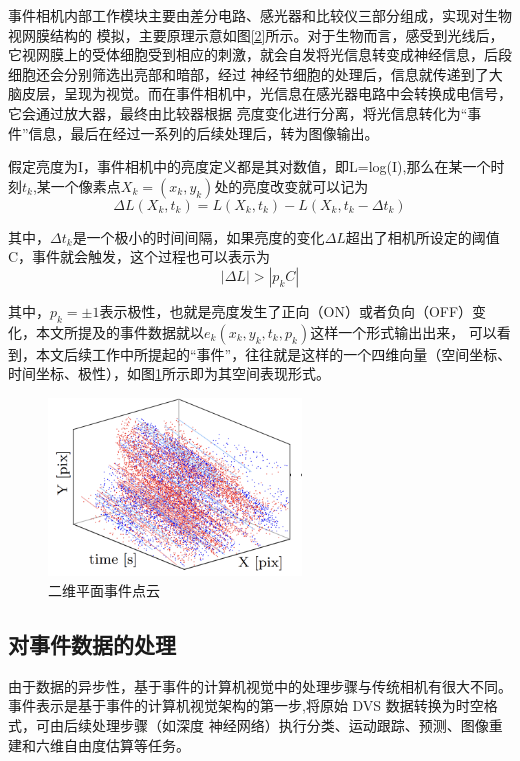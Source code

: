 事件相机内部工作模块主要由差分电路、感光器和比较仪三部分组成，实现对生物视网膜结构的
模拟，主要原理示意如图\ref{2}所示。对于生物而言，感受到光线后，它视网膜上的受体细胞受到相应的刺激，就会自发将光信息转变成神经信息，后段细胞还会分别筛选出亮部和暗部，经过
神经节细胞的处理后，信息就传递到了大脑皮层，呈现为视觉。而在事件相机中，光信息在感光器电路中会转换成电信号，它会通过放大器，最终由比较器根据
亮度变化进行分离，将光信息转化为“事件”信息，最后在经过一系列的后续处理后，转为图像输出。\cite{eibensteiner2017event}

假定亮度为I，事件相机中的亮度定义都是其对数值，即L=log(I),那么在某一个时刻$t_k$,某一个像素点$X_k=(x_k,y_k)$处的亮度改变就可以记为
\begin{equation} 
    \Delta L(X_k,t_k)=L(X_k,t_k)-L(X_k,t_k-\Delta t_k)
\end{equation}

其中，$\Delta t_k$是一个极小的时间间隔，如果亮度的变化$\Delta L$超出了相机所设定的阈值C，事件就会触发，这个过程也可以表示为
\begin{equation} 
    |\Delta L|>|p_kC|
\end{equation}

其中，$p_k=\pm1$表示极性，也就是亮度发生了正向（ON）或者负向（OFF）变化，本文所提及的事件数据就以$e_k(x_k,y_k,t_k,p_k)$这样一个形式输出出来，
可以看到，本文后续工作中所提起的“事件”，往往就是这样的一个四维向量（空间坐标、
时间坐标、极性），如图\ref{4}所示即为其空间表现形式。
\begin{figure}
    \centering
    \includegraphics[width=0.6\textwidth]{figures/event_stream.png}
    \caption{二维平面事件点云}
    \label{4}
\end{figure}

\subsection{对事件数据的处理}
由于数据的异步性，基于事件的计算机视觉中的处理步骤与传统相机有很大不同。
事件表示是基于事件的计算机视觉架构的第一步,将原始 DVS 数据转换为时空格式，可由后续处理步骤（如深度
神经网络）执行分类、运动跟踪、预测、图像重建和六维自由度估算等任务。

